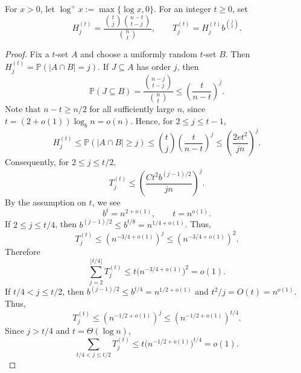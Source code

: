 \documentclass[11pt,reqno]{amsart}
\newtheorem{lemma}[theorem]{Lemma}
\theoremstyle{definition}
\theoremstyle{remark}
\newcommand{\PP}{\mathbb P}
\begin{document}
For $x>0$, let $\log^+x:=\max\{\log x,0\}$. For an integer
$t\geq0$, set
\[
 H_j^{(t)}=
 \frac{\binom tj\binom{n-t}{t-j}}{\binom nt},\qquad
 T_j^{(t)}=H_j^{(t)}b^{\binom j2}.
\]


\begin{proof} Fix a $t$-set $A$  and choose a uniformly random $t$-set $B$.  Then
$H_j^{(t)}=\PP(|A\cap B|=j)$.  If $J\subseteq A$ has order $j$, then
\[
 \PP(J\subseteq B)=\frac{\binom{n-j}{t-j}}{\binom{n}{t}}
 \le\left(\frac{t}{n-t}\right)^j.
\]
Note that $n-t\ge n/2$ for all sufficiently
large $n$, since $t=(2+o(1))\log_b n=o(n)$.   Hence, for $2\le j\le t-1$,
\begin{equation}\label{eq:small-overlap-hypergeometric}
 H_j^{(t)}
 \le \PP(|A\cap B|\ge j)
 \le \binom tj\left(\frac{t}{n-t}\right)^j
 \le\left(\frac{2et^2}{jn}\right)^j.
\end{equation}
Consequently, for $2\le j\le t/2$,
\[
 T_j^{(t)}\le
 \left(\frac{Ct^2b^{(j-1)/2}}{jn}\right)^j.
\]
By  the assumption on $t$, we see 
\begin{equation}\label{eq:bt-overlap-scale}
 b^t=n^{2+o(1)},\qquad t=n^{o(1)}.
\end{equation}
If $2\le j\le t/4$, then
$b^{(j-1)/2}\le b^{t/8}=n^{1/4+o(1)}$. Thus, $$T_j^{(t)}\leq(n^{-3/4+o(1)})^{j}\leq(n^{-3/4+o(1)})^{2}.$$
  Therefore
\begin{equation}\label{eq:small-overlap-sum}
 \sum_{j=2}^{\lfloor t/4\rfloor}T_j^{(t)}
 \le t\bigl(n^{-3/4+o(1)}\bigr)^2=o(1).
\end{equation}
If $t/4<j\le t/2$, then
$b^{(j-1)/2}\le b^{t/4}=n^{1/2+o(1)}$ and $t^2/j=O(t)=n^{o(1)}$.
Thus, $$T_j^{(t)}\leq(n^{-1/2+o(1)})^{j}\leq(n^{-1/2+o(1)})^{t/4}.$$
 Since $j>t/4$ and $t=\Theta(\log n)$,
\begin{equation}\label{eq:middle-overlap-sum}
 \sum_{t/4<j\le t/2}T_j^{(t)}
 \le t\bigl(n^{-1/2+o(1)}\bigr)^{t/4}=o(1).
\end{equation}


\end{proof}
\end{document}
